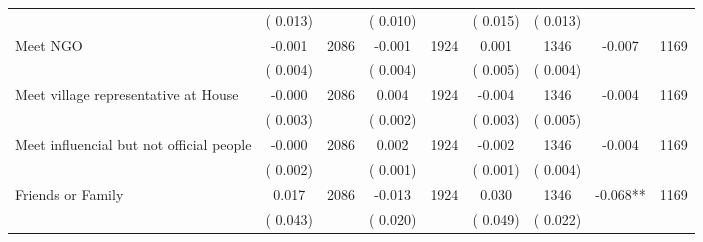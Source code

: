 \begin{tabular}{l*{8}{c}}
                       &       (       0.013)            &                               &       (       0.010)            &                               &       (       0.015)            &       (       0.013) &                  \\
Meet NGO        &             -0.001      &       2086       &             -0.001      &       1924       &              0.001      &       1346  &       -0.007 &       1169       \\
                       &       (       0.004)            &                               &       (       0.004)            &                               &       (       0.005)            &       (       0.004) &                  \\
Meet village representative at House        &             -0.000      &       2086       &              0.004      &       1924       &             -0.004      &       1346  &       -0.004 &       1169       \\
                       &       (       0.003)            &                               &       (       0.002)            &                               &       (       0.003)            &       (       0.005) &                  \\
Meet influencial but not official people        &             -0.000      &       2086       &              0.002      &       1924       &             -0.002      &       1346  &       -0.004 &       1169       \\
                       &       (       0.002)            &                               &       (       0.001)            &                               &       (       0.001)            &       (       0.004) &                  \\
Friends or Family        &              0.017      &       2086       &             -0.013      &       1924       &              0.030      &       1346  &       -0.068** &       1169       \\
                       &       (       0.043)            &                               &       (       0.020)            &                               &       (       0.049)            &       (       0.022) &                  \\
\hline \end{tabular}